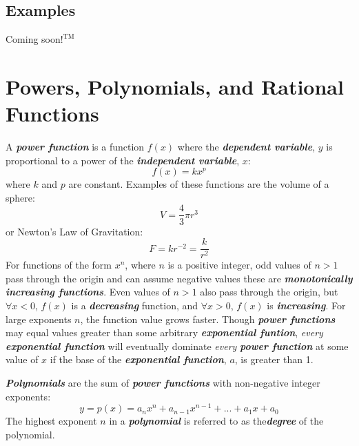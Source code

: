 \begin{center}
\section*{\small Examples}
Coming soon$!^{\text{TM}}$
\end{center}

\section{Powers, Polynomials, and Rational\\Functions}
A \textbf{\textit{power function}} is a function $f(x)$ where the \textbf{\textit{dependent variable}}, $y$ is proportional to a power of the \textbf{\textit{independent variable}}, $x$:
\begin{equation}
f(x) = kx^p
\end{equation}
where $k$ and $p$ are constant. Examples of these functions are the volume of a sphere:
\begin{equation}
V = \frac{4}{3}\pi r^3
\end{equation}
or Newton's Law of Gravitation:
\begin{equation}
F = kr^{-2} = \frac{k}{r^2}
\end{equation}
For functions of the form $x^n$, where $n$ is a positive integer, odd values of $n>1$ pass through the origin and can assume negative values these are \textbf{\textit{monotonically increasing functions}}. Even values of $n > 1$ also pass through the origin, but $\forall x < 0$, $f(x)$ is a \textbf{\textit{decreasing}} function, and $\forall x > 0$, $f(x)$ is \textbf{\textit{increasing}}. For large exponents $n$, the function value grows faster. Though \textbf{\textit{power functions}} may equal values greater than some arbitrary \textbf{\textit{exponential funtion}}, \textit{every} \textbf{\textit{exponential function}} will eventually dominate \textit{every} \textbf{\textit{power function}} at some value of $x$ if the base of the \textbf{\textit{exponential function}}, $a$, is greater than 1.

\vspace{0.1in}
\textbf{\textit{Polynomials}} are the sum of \textbf{\textit{power functions}} with non-negative integer exponents:
\begin{equation}
y = p(x) = a_nx^n + a_{n-1} x^{n-1} + ... + a_1 x + a_0
\end{equation}
The highest exponent $n$ in a \textbf{\textit{polynomial}} is referred to as the\textbf{\textit{degree}} of the polynomial.

